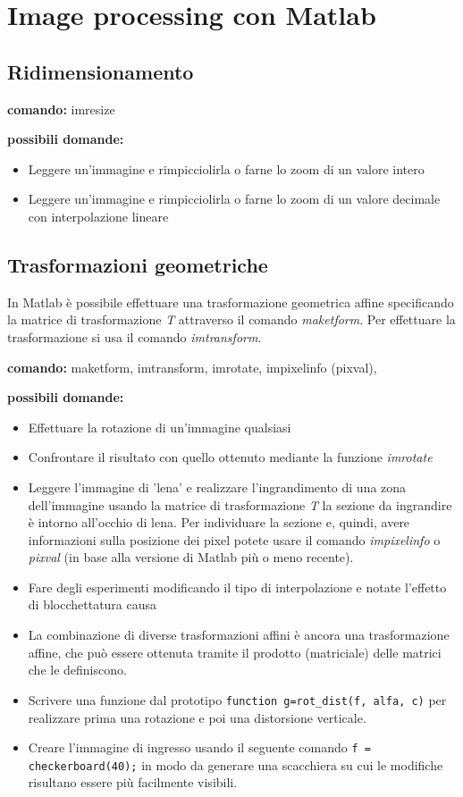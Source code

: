 \chapter{Image processing con Matlab}

\section{Ridimensionamento}

\textbf{comando:} imresize

\textbf{possibili domande:}
\begin{itemize}
	\item Leggere un'immagine e rimpicciolirla o farne lo zoom di un valore intero
	\item Leggere un'immagine e rimpicciolirla o farne lo zoom di un valore decimale con interpolazione lineare
\end{itemize}

\section{Trasformazioni geometriche}
In Matlab è possibile effettuare una \gls{trasformazione geometrica affine}
specificando la matrice di trasformazione \textit{T} attraverso il comando \textit{maketform}.
Per effettuare la trasformazione si usa il comando \textit{imtransform}.

\textbf{comando:} maketform, imtransform, imrotate, impixelinfo (pixval),

\textbf{possibili domande:}
\begin{itemize}
	\item Effettuare la rotazione di un’immagine qualsiasi
	\item Confrontare il risultato con quello ottenuto mediante la funzione \textit{imrotate}
	\item Leggere l'immagine di 'lena' e realizzare l'ingrandimento di una zona dell’immagine usando la matrice di trasformazione \textit{T}
	la sezione da ingrandire è intorno all'occhio di lena.
	Per individuare la sezione e, quindi, avere informazioni sulla posizione dei pixel potete usare il comando \textit{impixelinfo} o \textit{pixval} (in base alla versione di Matlab più o meno recente).
	\item Fare degli esperimenti modificando il tipo di interpolazione e notate l'effetto di blocchettatura causa
	
	\item La combinazione di diverse trasformazioni affini è ancora una trasformazione 	affine, che può essere ottenuta tramite il prodotto (matriciale) delle matrici che le definiscono.
	
	\item Scrivere una funzione dal prototipo \verb|function g=rot_dist(f, alfa, c)| per realizzare prima una rotazione e poi una distorsione verticale.
	
	\item Creare l'immagine di ingresso usando il seguente comando
	\verb|f = checkerboard(40);| in modo da generare una scacchiera su cui le modifiche risultano essere più facilmente visibili.
\end{itemize}

